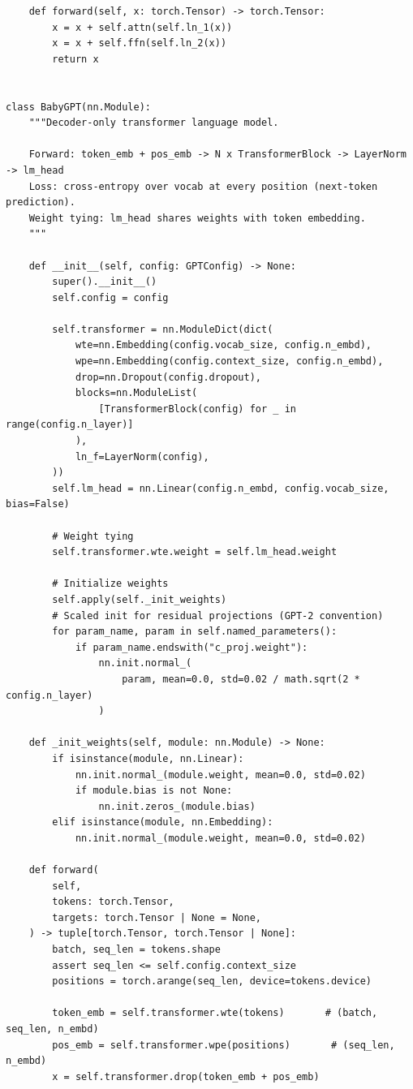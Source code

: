 \begin{lstlisting}
    def forward(self, x: torch.Tensor) -> torch.Tensor:
        x = x + self.attn(self.ln_1(x))
        x = x + self.ffn(self.ln_2(x))
        return x


class BabyGPT(nn.Module):
    """Decoder-only transformer language model.

    Forward: token_emb + pos_emb -> N x TransformerBlock -> LayerNorm -> lm_head
    Loss: cross-entropy over vocab at every position (next-token prediction).
    Weight tying: lm_head shares weights with token embedding.
    """

    def __init__(self, config: GPTConfig) -> None:
        super().__init__()
        self.config = config

        self.transformer = nn.ModuleDict(dict(
            wte=nn.Embedding(config.vocab_size, config.n_embd),
            wpe=nn.Embedding(config.context_size, config.n_embd),
            drop=nn.Dropout(config.dropout),
            blocks=nn.ModuleList(
                [TransformerBlock(config) for _ in range(config.n_layer)]
            ),
            ln_f=LayerNorm(config),
        ))
        self.lm_head = nn.Linear(config.n_embd, config.vocab_size, bias=False)

        # Weight tying
        self.transformer.wte.weight = self.lm_head.weight

        # Initialize weights
        self.apply(self._init_weights)
        # Scaled init for residual projections (GPT-2 convention)
        for param_name, param in self.named_parameters():
            if param_name.endswith("c_proj.weight"):
                nn.init.normal_(
                    param, mean=0.0, std=0.02 / math.sqrt(2 * config.n_layer)
                )

    def _init_weights(self, module: nn.Module) -> None:
        if isinstance(module, nn.Linear):
            nn.init.normal_(module.weight, mean=0.0, std=0.02)
            if module.bias is not None:
                nn.init.zeros_(module.bias)
        elif isinstance(module, nn.Embedding):
            nn.init.normal_(module.weight, mean=0.0, std=0.02)

    def forward(
        self,
        tokens: torch.Tensor,
        targets: torch.Tensor | None = None,
    ) -> tuple[torch.Tensor, torch.Tensor | None]:
        batch, seq_len = tokens.shape
        assert seq_len <= self.config.context_size
        positions = torch.arange(seq_len, device=tokens.device)

        token_emb = self.transformer.wte(tokens)       # (batch, seq_len, n_embd)
        pos_emb = self.transformer.wpe(positions)       # (seq_len, n_embd)
        x = self.transformer.drop(token_emb + pos_emb)


\end{lstlisting}
